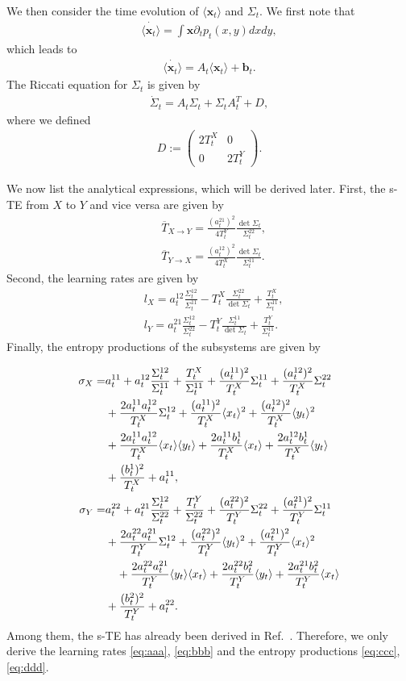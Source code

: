 \documentclass[%
 reprint,
 amsmath,amssymb,
 aps,
]{revtex4-1}
\newcommand{\balign}[1]{\begin{align} #1 \end{align}}
\newcommand{\average}[1]{\ensuremath{\langle#1\rangle} }
\newcommand\str{\overline{T}_{X\to Y}}
\newcommand{\del}{\partial}
\theoremstyle{plain}
\begin{document}
We then consider the time evolution of $\average{\bm{x}_t}$ and $\Sigma_t$.  We first note that
\balign{
\dot{\average{\bm{x}_t}}=\int \bm{x}\del_t p_t(x,y)dxdy,
}
which leads to
\balign{
\dot{\average{\bm{x}_t}}=A_t\average{\bm{x}_t}+\bm{b}_t. \label{eq:ave}
}
The Riccati equation for $\Sigma_t$ is given by
\balign{
\dot{\Sigma}_t=A_t\Sigma_t+\Sigma_tA^T_t+D, \label{eq:ricc}
}
where we defined
\balign{
D:=
\begin{pmatrix}
2T_t^X &0 \\
0 &2T_t^Y
\end{pmatrix}.
}


We now list the analytical expressions, which will be derived later.
First, the s-TE from $X$ to $Y$ and vice versa are given by
\balign{
&\str=\frac{(a_t^{21})^2}{4T_t^Y}\frac{\det \Sigma_t}{\Sigma_t^{22}}, \label{eq:trxyt}\\
&\overline{T}_{Y\to X}=\frac{(a_t^{12})^2}{4T_t^X}\frac{\det \Sigma_t}{\Sigma_t^{11}}. \label{eq:tryxt}
}
Second, the learning rates are given by
\balign{
&l_{X}=a_t^{12}\frac{\Sigma^{12}_t}{\Sigma^{11}_t}-T_t^X\frac{\Sigma_t^{22}}{\det\Sigma_t}+\frac{T_t^X}{\Sigma_t^{11}}, \label{eq:aaa}\\
&l_{Y}=a_t^{21}\frac{\Sigma^{12}_t}{\Sigma^{22}_t}-T_t^Y\frac{\Sigma_t^{11}}{\det\Sigma_t}+\frac{T_t^Y} {\Sigma_t^{11}}. \label{eq:bbb}
}
Finally, the entropy productions of the subsystems are given by \par
\balign{
\sigma_{X}=&a^{11}_t+a_t^{12}\frac{\Sigma^{12}_t}{\Sigma^{11}_t}+\frac{T^X_t}{\Sigma^{11}_t}+\frac{(a_t^{11})^2}{T_t^X}\Sigma^{11}_t+\frac{(a_t^{12})^2}{T_t^X}\Sigma_t^{22} \notag\\
&+\frac{2a_t^{11}a_t^{12}}{T_t^X}\Sigma^{12}_t+\frac{(a_t^{11})^2}{T_t^X}\average{x_t}^2+\frac{(a_t^{12})^2}{T_t^X}\average{y_t}^2 \notag\\
&+\frac{2a_t^{11}a_t^{12}}{T_t^X}\average{x_t}\average{y_t}+\frac{2a_t^{11}b_t^1}{T_t^X}\average{x_t}+\frac{2a_t^{12}b_t^1}{T_t^X}\average{y_t}\notag \\
&+\frac{(b^1_t)^2}{T_t^X}+a_t^{11}, \label{eq:ccc}\\
\sigma_{Y}=&a^{22}_t+a_t^{21}\frac{\Sigma^{12}_t}{\Sigma^{22}_t}+\frac{T^Y_t}{\Sigma^{22}_t}+\frac{(a_t^{22})^2}{T_t^Y}\Sigma^{22}_t+\frac{(a_t^{21})^2}{T_t^Y}\Sigma_t^{11}\notag \\
&+\frac{2a_t^{22}a_t^{21}}{T_t^Y}\Sigma^{12}_t+\frac{(a_t^{22})^2}{T_t^Y}\average{y_t}^2+\frac{(a_t^{21})^2}{T_t^Y}\average{x_t}^2 \notag\\
&\ \ \ +\frac{2a_t^{22}a_t^{21}}{T_t^Y}\average{y_t}\average{x_t}+\frac{2a_t^{22}b_t^2}{T_t^Y}\average{y_t}+\frac{2a_t^{21}b_t^2}{T_t^Y}\average{x_t}\notag \\
&+\frac{(b^2_t)^2}{T_t^Y}+a_t^{22}. \label{eq:ddd}
}
Among them, the s-TE has already been derived in Ref.~\cite{Ito2016}. Therefore, we only derive the learning rates \eqref{eq:aaa}, \eqref{eq:bbb} and the entropy productions \eqref{eq:ccc}, \eqref{eq:ddd}. 
\end{document}
